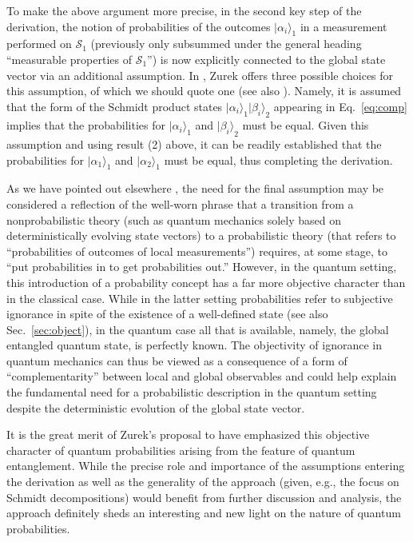 \documentclass[twocolumn,aps,floatfix,amsmath,amssymb,showpacs,nofootinbib]{revtex4}
\newcommand{\ket}[1]{\ensuremath{|{#1\rangle}}}
\begin{document}
To make the above argument more precise, in the second key step of the
derivation, the notion of probabilities of the outcomes
$\ket{\alpha_i}_1$ in a measurement performed on $\mathcal{S}_1$
(previously only subsummed under the general heading ``measurable
properties of $\mathcal{S}_1$'') is now explicitly connected to the
global state vector via an additional assumption. In
\cite{Zurek:2004:yb}, Zurek offers three possible choices for
this assumption, of which we should quote one (see also
\cite{Barnum:2003:yb}). Namely, it is assumed that the form of
the Schmidt product states $\ket{\alpha_i}_1\ket{\beta_i}_2$ appearing
in Eq.~\eqref{eq:comp} implies that the probabilities for
$\ket{\alpha_i}_1$ and $\ket{\beta_i}_2$ must be equal. Given this
assumption and using result (2) above, it can be readily established
\cite{Schlosshauer:2003:ms,Schlosshauer:2003:tv,Zurek:2004:yb} that
the probabilities for $\ket{\alpha_1}_1$ and $\ket{\alpha_2}_1$ must
be equal, thus completing the derivation.

As we have pointed out elsewhere \cite{Schlosshauer:2003:ms}, the need
for the final assumption may be considered a reflection of the
well-worn phrase that a transition from a nonprobabilistic theory
(such as quantum mechanics solely based on deterministically evolving
state vectors) to a probabilistic theory (that refers to
``probabilities of outcomes of local measurements'') requires, at some
stage, to ``put probabilities in to get probabilities out.'' However,
in the quantum setting, this introduction of a probability concept has
a far more objective character than in the classical case. While in
the latter setting probabilities refer to subjective ignorance in
spite of the existence of a well-defined state (see also
Sec.~\ref{sec:object}), in the quantum case all that is available,
namely, the global entangled quantum state, is perfectly known. The
objectivity of ignorance in quantum mechanics can thus be viewed as a
consequence of a form of ``complementarity'' between local and global
observables \cite{Zurek:2004:yb} and could help explain the
fundamental need for a probabilistic description in the quantum
setting despite the deterministic evolution of the global state
vector.

It is the great merit of Zurek's proposal to have emphasized this
objective character of quantum probabilities arising from the feature
of quantum entanglement. While the precise role and importance of the
assumptions entering the derivation as well as the generality of the
approach (given, e.g., the focus on Schmidt decompositions) would
benefit from further discussion and analysis, the approach definitely
sheds an interesting and new light on the nature of quantum
probabilities.
\end{document}
